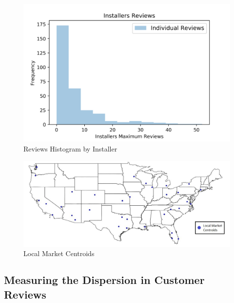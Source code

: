 \documentclass[msom,blindrev]{informs3}
\begin{document}





\begin{figure}
	\centering
	\includegraphics[width=1\linewidth]{histogram_ind_max_reviews_ct.png}
	\caption{Reviews Histogram by Installer}
	\label{histogram_ind_max_reviews_ct}
\end{figure}





\begin{figure}
	\centering
	\includegraphics[width=1\linewidth]{markets.jpg}
	\caption{Local Market Centroids}
	\label{fig: markets}
\end{figure}

\subsection{Measuring the Dispersion in Customer Reviews} \label{Subsec: Measure Dispersion}
\end{document}
